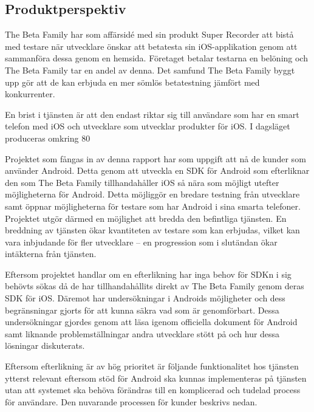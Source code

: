 \subsection{Produktperspektiv}
\label{subsec:perspective}

The Beta Family har som affärsidé med sin produkt Super Recorder att bistå med testare när utvecklare önskar att betatesta sin iOS-applikation genom att sammanföra dessa genom en hemsida. Företaget betalar testarna en belöning och The Beta Family tar en andel av denna. Det samfund The Beta Family byggt upp gör att de kan erbjuda en mer sömlös betatestning jämfört med konkurrenter. 

En brist i tjänsten är att den endast riktar sig till användare som har en smart telefon med iOS och utvecklare som utvecklar produkter för iOS. I dagsläget produceras omkring 80 %

Projektet som fångas in av denna rapport har som uppgift att nå de kunder som använder Android. Detta genom att utveckla en SDK för Android som efterliknar den som The Beta Family tillhandahåller iOS så nära som möjligt utefter möjligheterna för Android. Detta möjliggör en bredare testning från utvecklare samt öppnar möjligheterna för testare som har Android i sina smarta telefoner. Projektet utgör därmed en möjlighet att bredda den befintliga tjänsten. En breddning av tjänsten ökar kvantiteten av testare som kan erbjudas, vilket kan vara inbjudande för fler utvecklare – en progression som i slutändan ökar intäkterna från tjänsten.

Eftersom projektet handlar om en efterlikning har inga behov för SDKn i sig behövts sökas då de har tillhandahållits direkt av The Beta Family genom deras SDK för iOS. Däremot har undersökningar i Androids möjligheter och dess begränsningar gjorts för att kunna säkra vad som är genomförbart. Dessa undersökningar gjordes genom att läsa igenom officiella dokument för Android samt liknande problemställningar andra utvecklare stött på och hur dessa lösningar diskuterats.

Eftersom efterlikning är av hög prioritet är följande funktionalitet hos tjänsten ytterst relevant eftersom stöd för Android ska kunnas implementeras på tjänsten utan att systemet ska behöva förändras till en komplicerad och tudelad process för användare. Den nuvarande processen för kunder beskrivs nedan.

